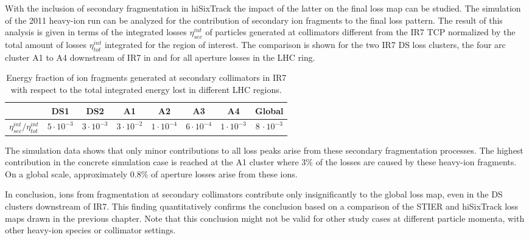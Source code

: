 With the inclusion of secondary fragmentation in hiSixTrack the impact of the latter on the final loss map can be studied. The simulation of the 2011 heavy-ion run can be analyzed for the contribution of secondary ion fragments to the final loss pattern. The result of this analysis is given in terms of the integrated losses $\eta_{sec}^{int}$ of particles generated at collimators different from the IR7 TCP normalized by the total amount of losses $\eta_{tot}^{int}$ integrated for the region of interest. The comparison is shown for the two IR7 DS loss clusters, the four arc cluster A1 to A4 downstream of IR7 in  and for all aperture losses in the LHC ring. 
%
\begin{table}[b]
\centering
\caption{Energy fraction of ion fragments generated at secondary collimators in IR7 with respect to the total integrated energy lost in different LHC regions. }
\label{tab:secondary}
\begin{tabular}{cccccccc}
                                \toprule                                             & DS1              & DS2              & A1                 & A2                & A3                & A4              & Global \\ \midrule
$\eta_{sec}^{int}/\eta^{int}_{tot}$& $5\cdot 10^{-3}$ & $3\cdot 10^{-3}$ & $3\cdot 10^{-2}$ & $1 \cdot 10^{-4}$ & $6 \cdot 10^{-4}$ & $1\cdot10^{-3}$ & $8\,\cdot10^{-3}$  \\ \bottomrule
\end{tabular}
\end{table}
%

The simulation data shows that only minor contributions to all loss peaks arise from these secondary fragmentation processes. The highest contribution in the concrete simulation case is reached at the A1 cluster where 3\% of the losses are caused by these heavy-ion fragments. On a global scale, approximately 0.8\% of aperture losses arise from these ions. 

In conclusion, ions from fragmentation at secondary collimators contribute only insignificantly to the global loss map, even in the DS clusters downstream of IR7. This finding quantitatively confirms the conclusion based on a comparison of the STIER and hiSixTrack loss maps drawn in the previous chapter. Note that this conclusion might not be valid for other study cases at different particle momenta, with other heavy-ion species or collimator settings.